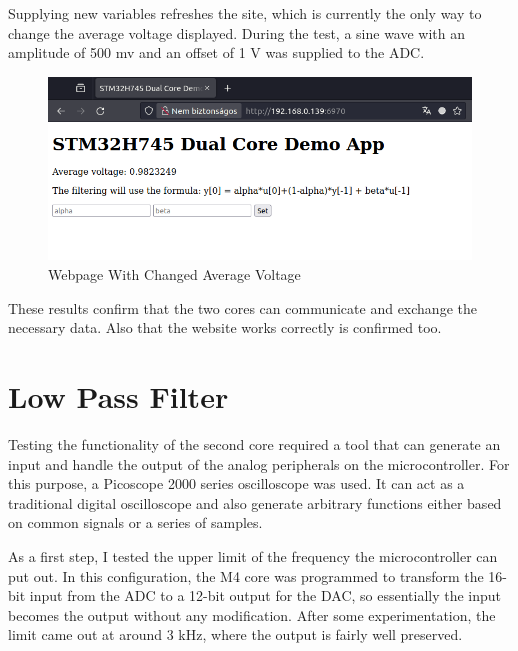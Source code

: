 Supplying new variables refreshes the site, which is currently the only way to change the average voltage displayed. During the test, a sine wave with an amplitude of 500 mv and an offset of 1 V was supplied to the ADC.

\begin{figure}[H]
    \centering
    \includegraphics[width=150mm, keepaspectratio]{figures/webpage-test2.png}
    \caption{Webpage With Changed Average Voltage}
    \label{fig:webpage-test2}
\end{figure}

These results confirm that the two cores can communicate and exchange the necessary data. Also that the website works correctly is confirmed too.

\section{Low Pass Filter}

Testing the functionality of the second core required a tool that can generate an input and handle the output of the analog peripherals on the microcontroller. For this purpose, a Picoscope 2000 series oscilloscope was used. It can act as a traditional digital oscilloscope and also generate arbitrary functions either based on common signals or a series of samples.

As a first step, I tested the upper limit of the frequency the microcontroller can put out. In this configuration, the M4 core was programmed to transform the 16-bit input from the ADC to a 12-bit output for the DAC, so essentially the input becomes the output without any modification. After some experimentation, the limit came out at around 3 kHz, where the output is fairly well preserved.

